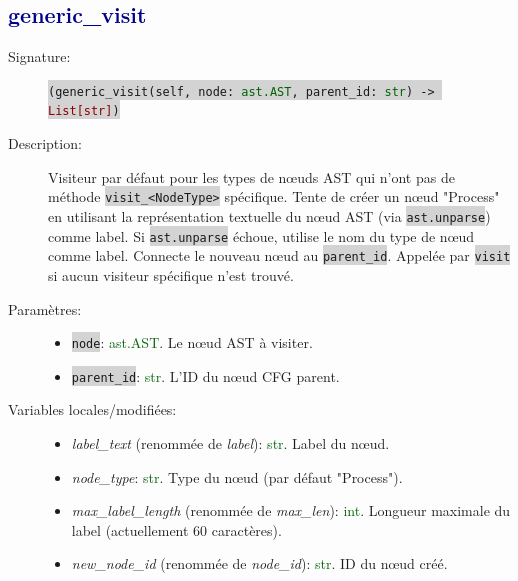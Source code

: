\documentclass[11pt,a4paper]{article}
\newcommand{\code}[1]{\colorbox{lightgray}{\texttt{\small #1}}}
\newcommand{\var}[1]{\textit{#1}}
\newcommand{\vartype}[1]{\textcolor{darkgreen}{#1}}
\newcommand{\methodname}[1]{\textbf{\textcolor{darkblue}{#1}}}
\newcommand{\param}[1]{\code{#1}}
\newcommand{\rettype}[1]{\textcolor{darkred}{#1}}
\begin{document}
\subsection*{\methodname{generic\_visit}}
\begin{description}
    \item[Signature:] \code{(generic\_visit(self, node: \vartype{ast.AST}, parent\_id: \vartype{str}) -> \rettype{List[str]})}
    \item[Description:] Visiteur par défaut pour les types de nœuds AST qui n'ont pas de méthode \code{visit\_<NodeType>} spécifique. Tente de créer un nœud "Process" en utilisant la représentation textuelle du nœud AST (via \code{ast.unparse}) comme label. Si \code{ast.unparse} échoue, utilise le nom du type de nœud comme label. Connecte le nouveau nœud au \param{parent\_id}. Appelée par \code{visit} si aucun visiteur spécifique n'est trouvé.
    \item[Paramètres:]
    \begin{itemize}
        \item \param{node}: \vartype{ast.AST}. Le nœud AST à visiter.
        \item \param{parent\_id}: \vartype{str}. L'ID du nœud CFG parent.
    \end{itemize}
    \item[Variables locales/modifiées:]
    \begin{itemize}
        \item \var{label\_text} (renommée de \var{label}): \vartype{str}. Label du nœud.
        \item \var{node\_type}: \vartype{str}. Type du nœud (par défaut "Process").
        \item \var{max\_label\_length} (renommée de \var{max\_len}): \vartype{int}. Longueur maximale du label (actuellement 60 caractères).
        \item \var{new\_node\_id} (renommée de \var{node\_id}): \vartype{str}. ID du nœud créé.
    \end{itemize}
\end{description}
\end{document}
